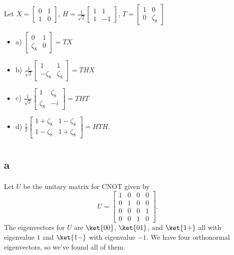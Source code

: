\documentclass[letterpaper,12pt,oneside,onecolumn]{article}
\begin{document}
\section{}
\paragraph{}
Let $X = \begin{bmatrix} 0 & 1 \\ 1 & 0 \end{bmatrix}$, $H = \frac{1}{\sqrt{2}} \begin{bmatrix} 1 & 1 \\ 1 & -1 \end{bmatrix}$, $T = \begin{bmatrix} 1 & 0 \\ 0 & \zeta_8\end{bmatrix}$
\begin{itemize}
\item a) $\begin{bmatrix} 0 & 1 \\ \zeta_8 & 0 \end{bmatrix} = TX$
\item b) $\frac{1}{\sqrt{2}}\begin{bmatrix} 1 & 1 \\ -\zeta_8 & \zeta_8 \end{bmatrix} = THX$
\item c) $\frac{1}{\sqrt{2}}\begin{bmatrix} 1 &\zeta_8 \\ \zeta_8 & -i\end{bmatrix}=THT$
\item d) $\frac{1}{2} \begin{bmatrix} 1+\zeta_8 & 1-\zeta_8 \\ 1-\zeta_8 & 1+\zeta_8\end{bmatrix}=HTH.$
\end{itemize}
\newpage
\section{}
\subsection{a}
\paragraph{}
Let $U$ be the unitary matrix for CNOT given by
$$U = \begin{bmatrix} 1 & 0 & 0 & 0 \\ 0& 1 & 0 & 0 \\ 0 & 0 & 0 & 1 \\ 0& 0 & 1 &0 \end{bmatrix}.$$
The eigenvectors for $U$ are $\ket{00}$, $\ket{01}$, and $\ket{1+}$ all with eigenvalue $1$ and $\ket{1-}$ with eigenvalue $-1$. We have four orthonormal eigenvectors, so we've found all of them.
\end{document}

